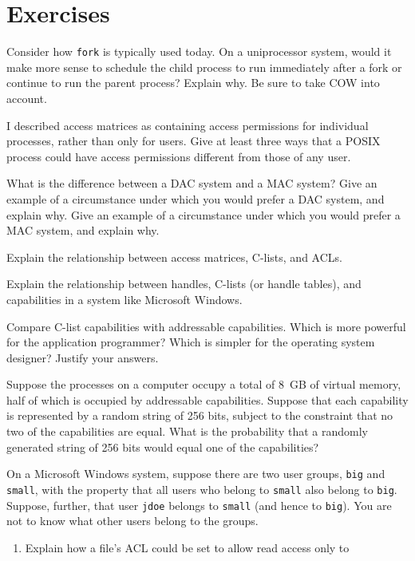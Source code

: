 \section*{Exercises}
\begin{chapterEnumerate}
\item
Consider how \verb|fork| is typically used today.  On a uniprocessor
system, would it make more sense to schedule the child process to run
immediately after a fork or continue to run the parent process?
Explain why.  Be sure to take COW into account.
\item
I described access matrices as containing access permissions for
individual processes, rather than only for  users.  Give at least three ways that a POSIX process
could have access permissions different from those of any user.
\item
What is the difference between a DAC system and a MAC system?  Give an
example of a circumstance under which you would prefer a DAC system, and
explain why.  Give an
example of a circumstance under which you would prefer a MAC system, and
explain why.  
\item
Explain the relationship between access matrices, C-lists, and ACLs.
\item
Explain the relationship between handles, C-lists (or handle tables), and capabilities
in a system like Microsoft Windows.
\item
Compare C-list capabilities with addressable capabilities.  Which is
more powerful for the application programmer?  Which is simpler for
the operating system designer?  Justify your answers.
\item
Suppose the processes on a computer occupy a total of 8~GB of virtual
memory, half of which is occupied by addressable capabilities.
Suppose that each capability is represented by a random string of 256
bits, subject to the constraint that no two of the capabilities are equal.  What is the probability that a randomly generated string of 256
bits would equal one of the capabilities?
\item\label{microsoft-acl-comparison-exercise}
On a Microsoft Windows system, suppose there are two user groups,
\verb|big| and \verb|small|, with the property that all users who
belong to \verb|small| also belong to \verb|big|.  Suppose, further,
that user \verb|jdoe| belongs to \verb|small| (and hence to
\verb|big|).  You are not to know what other users belong to the
groups.
\begin{enumerate}
\item
Explain how a file's ACL could be set to allow read access only to

\end{enumerate}
\end{chapterEnumerate}
